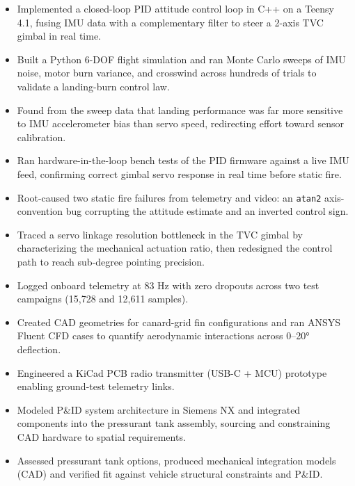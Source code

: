\begin{itemize}
  \item Implemented a closed-loop PID attitude control loop in C++ on a Teensy 4.1, fusing IMU data with a complementary filter to steer a 2-axis TVC gimbal in real time.
  \item Built a Python 6-DOF flight simulation and ran Monte Carlo sweeps of IMU noise, motor burn variance, and crosswind across hundreds of trials to validate a landing-burn control law.
  \item Found from the sweep data that landing performance was far more sensitive to IMU accelerometer bias than servo speed, redirecting effort toward sensor calibration.
  \item Ran hardware-in-the-loop bench tests of the PID firmware against a live IMU feed, confirming correct gimbal servo response in real time before static fire.
  \item Root-caused two static fire failures from telemetry and video: an \texttt{atan2} axis-convention bug corrupting the attitude estimate and an inverted control sign.
  \item Traced a servo linkage resolution bottleneck in the TVC gimbal by characterizing the mechanical actuation ratio, then redesigned the control path to reach sub-degree pointing precision.
  \item Logged onboard telemetry at 83 Hz with zero dropouts across two test campaigns (15,728 and 12,611 samples).
\end{itemize}
\entrygap

\begin{itemize}
  \item Created CAD geometries for canard-grid fin configurations and ran ANSYS Fluent CFD cases to quantify aerodynamic interactions across 0--20° deflection.
  \item Engineered a KiCad PCB radio transmitter (USB-C + MCU) prototype enabling ground-test telemetry links.
  \item Modeled P\&ID system architecture in Siemens NX and integrated components into the pressurant tank assembly, sourcing and constraining CAD hardware to spatial requirements.
  \item Assessed pressurant tank options, produced mechanical integration models (CAD) and verified fit against vehicle structural constraints and P\&ID.
\end{itemize}
\entrygap


